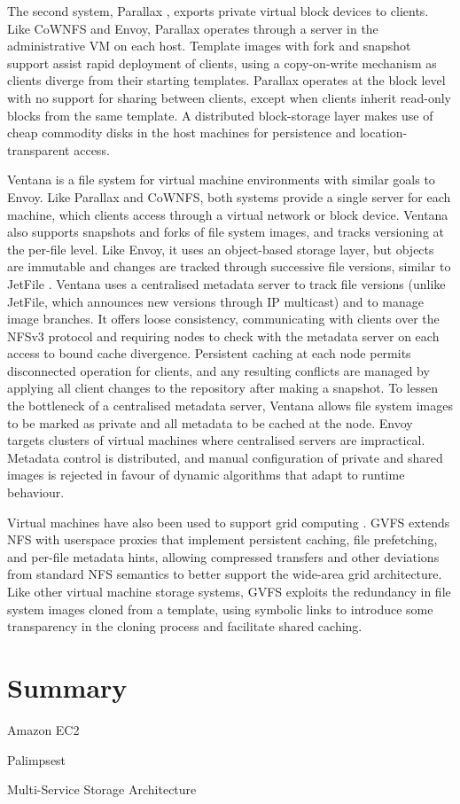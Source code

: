 The second system, Parallax \cite{warfield}, exports private virtual block devices to clients. Like CoWNFS and Envoy, Parallax operates through a server in the administrative VM on each host. Template images with fork and snapshot support assist rapid deployment of clients, using a copy-on-write mechanism as clients diverge from their starting templates. Parallax operates at the block level with no support for sharing between clients, except when clients inherit read-only blocks from the same template. A distributed block-storage layer makes use of cheap commodity disks in the host machines for persistence and location-transparent access.

Ventana \cite{pfaff} is a file system for virtual machine environments with similar goals to Envoy. Like Parallax and CoWNFS, both systems provide a single server for each machine, which clients access through a virtual network or block device. Ventana also supports snapshots and forks of file system images, and tracks versioning at the per-file level. Like Envoy, it uses an object-based storage layer, but objects are immutable and changes are tracked through successive file versions, similar to JetFile \cite{gronvall}. Ventana uses a centralised metadata server to track file versions (unlike JetFile, which announces new versions through IP multicast) and to manage image branches. It offers loose consistency, communicating with clients over the NFSv3 protocol and requiring nodes to check with the metadata server on each access to bound cache divergence. Persistent caching at each node permits disconnected operation for clients, and any resulting conflicts are managed by applying all client changes to the repository after making a snapshot. To lessen the bottleneck of a centralised metadata server, Ventana allows file system images to be marked as private and all metadata to be cached at the node. Envoy targets clusters of virtual machines where centralised servers are impractical. Metadata control is distributed, and manual configuration of private and shared images is rejected in favour of dynamic algorithms that adapt to runtime behaviour.

Virtual machines have also been used to support grid computing \cite{figueiredo03}. GVFS \cite{zhao04} extends NFS with userspace proxies that implement persistent caching, file prefetching, and per-file metadata hints, allowing compressed transfers and other deviations from standard NFS semantics to better support the wide-area grid architecture. Like other virtual machine storage systems, GVFS exploits the redundancy in file system images cloned from a template, using symbolic links to introduce some transparency in the cloning process and facilitate shared caching.

\section{Summary}

Amazon EC2 \cite{amazon}

Palimpsest \cite{roscoe03}

Multi-Service Storage Architecture \cite{bacon}